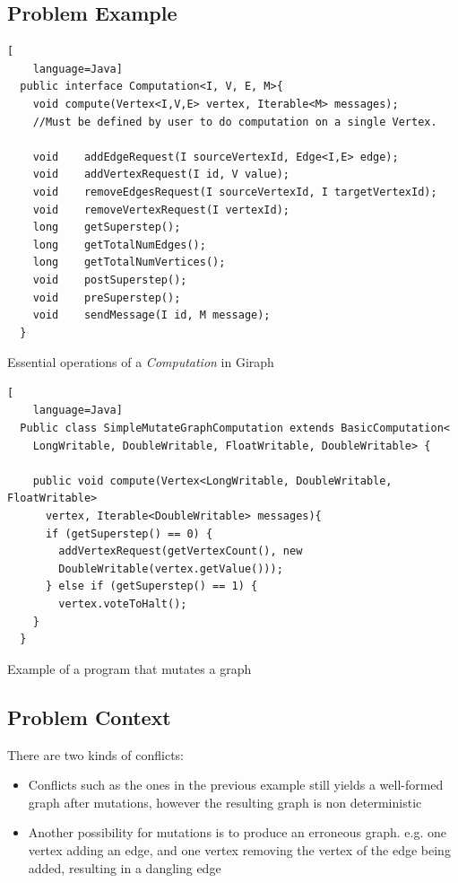 \subsection{Problem Example}
\begin{frame}[fragile]
\begin{lstlisting}[
    language=Java]
  public interface Computation<I, V, E, M>{
    void compute(Vertex<I,V,E> vertex, Iterable<M> messages);
    //Must be defined by user to do computation on a single Vertex.
	
    void 	addEdgeRequest(I sourceVertexId, Edge<I,E> edge);
    void 	addVertexRequest(I id, V value);
    void 	removeEdgesRequest(I sourceVertexId, I targetVertexId);
    void 	removeVertexRequest(I vertexId);
    long 	getSuperstep();
    long 	getTotalNumEdges();
    long 	getTotalNumVertices();
    void 	postSuperstep();
    void 	preSuperstep();
    void 	sendMessage(I id, M message);
  }
\end{lstlisting}
Essential operations of a \textit{Computation} in Giraph
\end{frame}

\begin{frame}[fragile]
\begin{lstlisting}[
    language=Java]
  Public class SimpleMutateGraphComputation extends BasicComputation<
    LongWritable, DoubleWritable, FloatWritable, DoubleWritable> {

    public void compute(Vertex<LongWritable, DoubleWritable, FloatWritable>
      vertex, Iterable<DoubleWritable> messages){ 
      if (getSuperstep() == 0) {
      	addVertexRequest(getVertexCount(), new
      	DoubleWritable(vertex.getValue()));
      } else if (getSuperstep() == 1) {
        vertex.voteToHalt();
    } 
  }
\end{lstlisting}
Example of a program that mutates a graph
\end{frame}

\subsection{Problem Context}
\begin{frame}
There are two kinds of conflicts:
\linebreak
\begin{itemize}
\item Conflicts such as the ones in the previous example still yields a well-formed graph after mutations, however the resulting graph is non deterministic
\linebreak
\item Another possibility for mutations is to produce an erroneous graph. e.g. one vertex adding an edge, and one vertex removing the vertex of the edge being added, resulting in a dangling edge
\end{itemize} 
\end{frame}


